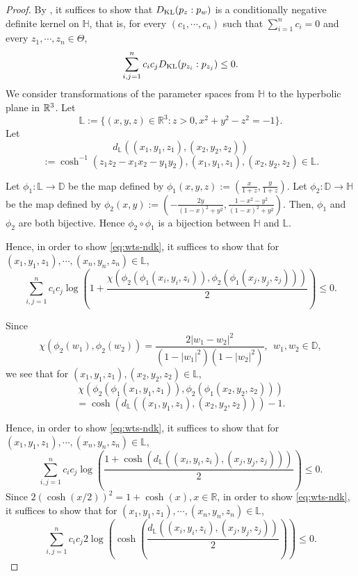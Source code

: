\documentclass[journal]{IEEEtran}
\begin{document}
\begin{proof}
By \cite{Schoenberg1938}, 
it suffices to show that $D_{\textup{KL}} (p_{z}:p_{w})$ is a conditionally negative definite kernel on $\mathbb H$, that is,  
for every $(c_1, \cdots, c_n)$ such that $\sum_{i=1}^{n} c_i = 0$ and every $z_1, \cdots, z_n \in \Theta$, 
\begin{equation}\label{eq:wts-ndk} 
\sum_{i,j=1}^{n} c_i c_j D_{\textup{KL}} (p_{z_i}:p_{z_j}) \le 0.
\end{equation}
We consider transformations of the parameter spaces from $\mathbb H$ to the hyperbolic plane in ${\mathbb{R}}^3$. 
Let 
\[ \mathbb L  := \{(x,y,z) \in \mathbb R^3 : z > 0, x^2 + y^2 - z^2 = -1\}. \]
Let 
\[ d_{\mathbb L} \left((x_1,y_1,z_1), (x_2,y_2,z_2)\right) \]
\[ := \cosh^{-1}\left( z_1 z_2 - x_1 x_2 - y_1 y_2 \right), (x_1,y_1,z_1), (x_2,y_2,z_2) \in \mathbb L.\]

Let $\phi_1 : \mathbb L \to \mathbb D$ be the map defined by $\phi_1(x,y,z) := \left(\frac{x}{1+z}, \frac{y}{1+z} \right)$.
 Let $\phi_2 : \mathbb D \to \mathbb H$ be the map defined by $\phi_2 (x,y) := \left(-\frac{2y}{(1-x)^2 + y^2}, \frac{1-x^2-y^2}{(1-x)^2 + y^2}\right)$.
Then, $\phi_1$ and $\phi_2$ are both bijective. 
Hence $\phi_2 \circ \phi_1$ is a bijection between $\mathbb H$ and $\mathbb L$. 

Hence, in order to show \eqref{eq:wts-ndk}, 
it suffices to show that for $(x_1, y_1, z_1), \cdots, (x_n, y_n, z_n) \in \mathbb L$, 
\[ \sum_{i,j=1}^{n} c_i c_j \log\left(1+ \frac{\chi\left(\phi_2 (\phi_1(x_i,y_i,z_i)), \phi_2 (\phi_1(x_j,y_j,z_j))\right)}{2}\right) \le 0. \]

Since
\[ \chi(\phi_2 (w_1), \phi_2 (w_2)) = \frac{2|w_1 - w_2|^2}{(1-|w_1|^2)(1-|w_2|^2)}, \ \ w_1, w_2 \in \mathbb D, \]
we see that for $(x_1,y_1,z_1), (x_2,y_2,z_2) \in \mathbb L$, 
\[ \chi\left(\phi_2 (\phi_1(x_1,y_1,z_1)), \phi_2 (\phi_1(x_2,y_2,z_2))\right) \]
\[ = 
\cosh\left(d_{\mathbb L}\left((x_1,y_1,z_1), (x_2,y_2,z_2)\right)\right)-1. \]

Hence, in order to show \eqref{eq:wts-ndk}, 
it suffices to show that for $(x_1, y_1, z_1), \cdots, (x_n, y_n, z_n) \in \mathbb L$, 
\[ \sum_{i,j=1}^{n} c_i c_j \log\left(\frac{1+\cosh\left(d_{\mathbb L}\left((x_i,y_i,z_i), (x_j,y_j,z_j)\right)\right)}{2}\right) \le 0. \]
Since $2(\cosh (x/2))^2 = 1 + \cosh(x), x \in \mathbb R$, 
in order to show \eqref{eq:wts-ndk}, 
it suffices to show that for $(x_1, y_1, z_1), \cdots, (x_n, y_n, z_n) \in \mathbb L$, 
\begin{equation}\label{eq:wts-FH} 
\sum_{i,j=1}^{n} c_i c_j 2\log\left( \cosh \left(\frac{d_{\mathbb L}\left((x_i,y_i,z_i), (x_j,y_j,z_j)\right)}{2}\right) \right) \le 0. 
\end{equation}


\end{proof}
\end{document}
